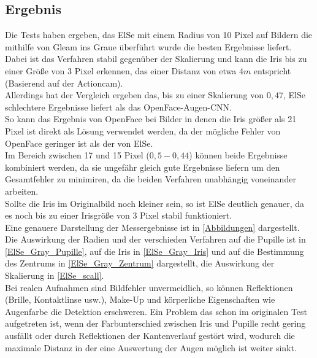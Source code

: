 \subsection{Ergebnis}
Die Tests haben ergeben, das ElSe mit einem Radius von 10 Pixel auf Bildern die mithilfe von Gleam ins Graue überführt wurde die besten Ergebnisse liefert. Dabei ist das Verfahren stabil gegenüber der Skalierung und kann die Iris bis zu einer Größe von 3 Pixel erkennen, das einer Distanz von etwa $4m$ entspricht (Basierend auf der Actioncam).\\
Allerdings hat der Vergleich ergeben das, bis zu einer Skalierung von $0,47$, ElSe schlechtere Ergebnisse liefert als das OpenFace-Augen-CNN.\\
So kann das Ergebnis von OpenFace bei Bilder in denen die Iris größer als 21 Pixel ist direkt als Lösung verwendet werden, da der mögliche Fehler von OpenFace geringer ist als der von ElSe.\\
Im Bereich zwischen 17 und 15 Pixel ($0,5-0,44$) können beide Ergebnisse kombiniert werden, da sie ungefähr gleich gute Ergebnisse liefern um den Gesamtfehler zu minimiren, da die beiden Verfahren unabhängig voneinander arbeiten.\\
Sollte die Iris im Originalbild noch kleiner sein, so ist ElSe deutlich genauer, da es noch bis zu einer Irisgröße von 3 Pixel stabil funktioniert.\\
Eine genauere Darstellung der Messergebnisse ist in \autoref{Abbildungen} dargestellt. Die Auswirkung der Radien und der verschieden Verfahren auf die Pupille ist in \autoref{ElSe_Gray_Pupille}, auf die Iris in \autoref{ElSe_Gray_Iris} und auf die Bestimmung des Zentrums in \autoref{ElSe_Gray_Zentrum} dargestellt, die Auswirkung der Skalierung in \autoref{ElSe_scall}.\\
Bei realen Aufnahmen sind Bildfehler unvermeidlich, so können Reflektionen (Brille, Kontaktlinse usw.), Make-Up und körperliche Eigenschaften wie Augenfarbe die Detektion erschweren. Ein Problem das schon im originalen Test \cite{ElSe} aufgetreten ist, wenn der Farbunterschied zwischen Iris und Pupille recht gering ausfällt oder durch Reflektionen der Kantenverlauf gestört wird, wodurch die maximale Distanz in der eine Auswertung der Augen möglich ist weiter sinkt.